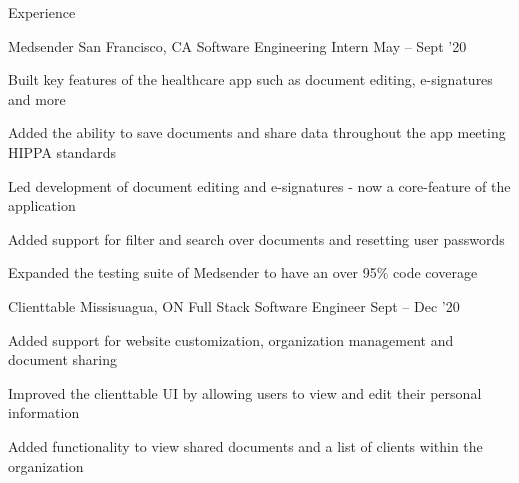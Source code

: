 \documentclass{resume} %
\begin{document}
\begin{rSection}{Experience}

  \begin{rWorkSection}{Medsender}
                      {San Francisco, CA}
                      {Software Engineering Intern}
                      {May -- Sept '20}
{
  \item Built key features of the healthcare app such as document 
    editing, e-signatures and more
  \item Added the ability to save documents and share data
    throughout the app meeting HIPPA standards
  \item Led development of document editing and 
    e-signatures - now a core-feature of the application
  \item Added support for filter and 
    search over documents and resetting user passwords
  \item Expanded the testing suite of Medsender to have an over 95\% code 
    coverage
}
\end{rWorkSection}

  \begin{rWorkSection}{Clienttable}
                      {Missisuagua, ON}
                      {Full Stack Software Engineer }
                      {Sept -- Dec '20}
  {
    \item Added support for website customization, organization management and document
      sharing 
    \item Improved the clienttable UI by allowing users to view and edit
      their personal information
    \item Added functionality to view shared documents and a list of clients within
      the organization
  }
  \end{rWorkSection}

\end{rSection}


\end{document}
